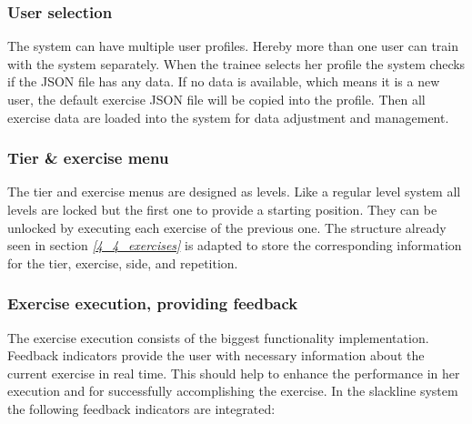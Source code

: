 
\subsubsection{User selection}
The system can have multiple user profiles. Hereby more than one user can train with the system separately. When the trainee selects her profile the system checks if the JSON file has any data. If no data is available, which means it is a new user, the default exercise JSON file will be copied into the profile. Then all exercise data are loaded into the system for data adjustment and management.

\subsubsection{Tier \& exercise menu}
The tier and exercise menus are designed as levels. Like a regular level system all levels are locked but the first one to provide a starting position. They can be unlocked by executing each exercise of the previous one. The structure already seen in section \textit{\ref{4_4_exercises}} is adapted to store the corresponding information for the tier, exercise, side, and repetition.

\subsubsection{Exercise execution, providing feedback}
The exercise execution consists of the biggest functionality implementation. Feedback indicators provide the user with necessary information about the current exercise in real time. This should help to enhance the performance in her execution and for successfully accomplishing the exercise. In the slackline system the following feedback indicators are integrated:

